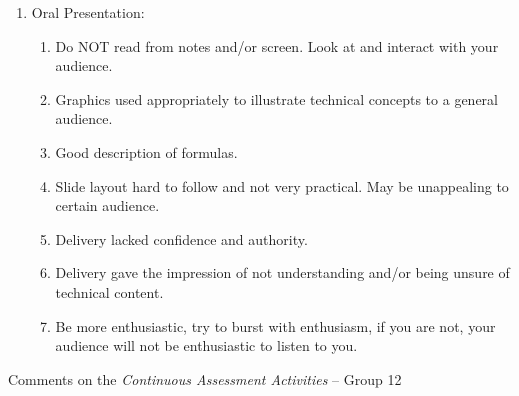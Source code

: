 \documentclass[14pt,twoside]{report}
\begin{document}
\begin{enumerate}
\item Oral Presentation:
\begin{enumerate}
%
\item Do NOT read from notes and/or screen. Look at and interact with your audience.
%
\item Graphics used appropriately to illustrate technical concepts to a general audience. 
%
\item Good description of formulas.
%
\item Slide layout hard to follow and not very practical. May be unappealing to certain audience.
%
\item Delivery lacked confidence and authority.
%
\item Delivery gave the impression of not understanding and/or being unsure of technical content.
%
\item Be more enthusiastic, try to burst with enthusiasm, if you are not, your audience will not be enthusiastic to listen to you.
%
\end{enumerate}

\end{enumerate}


\clearpage


\clearpage



\bigskip

\begin{center}
  {\Large Comments on the {\it Continuous Assessment Activities} -- Group 12}
\end{center}
\end{document}
